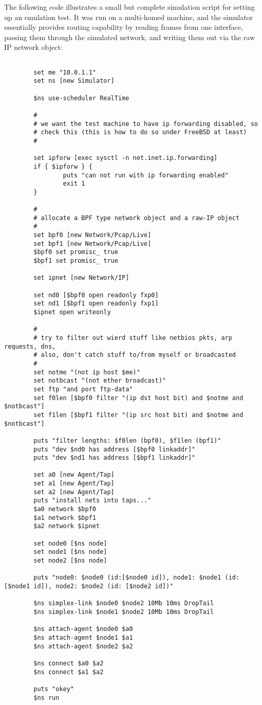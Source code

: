 The following code illustrates a small but complete
simulation script for setting up an emulation test.
It was run on a multi-homed machine, and the simulator essentially
provides routing capability by reading frames from one interface,
passing them through the simulated network, and writing them
out via the raw IP network object:
\begin{verbatim}

        set me "10.0.1.1"
        set ns [new Simulator]

        $ns use-scheduler RealTime

        #
        # we want the test machine to have ip forwarding disabled, so
        # check this (this is how to do so under FreeBSD at least)
        #

        set ipforw [exec sysctl -n net.inet.ip.forwarding]
        if { $ipforw } {
                puts "can not run with ip forwarding enabled"
                exit 1
        }

        #
        # allocate a BPF type network object and a raw-IP object
        #
        set bpf0 [new Network/Pcap/Live]
        set bpf1 [new Network/Pcap/Live]
        $bpf0 set promisc_ true
        $bpf1 set promisc_ true

        set ipnet [new Network/IP]

        set nd0 [$bpf0 open readonly fxp0]
        set nd1 [$bpf1 open readonly fxp1]
        $ipnet open writeonly

        #
        # try to filter out wierd stuff like netbios pkts, arp requests, dns,
        # also, don't catch stuff to/from myself or broadcasted
        #
        set notme "(not ip host $me)"
        set notbcast "(not ether broadcast)"
        set ftp "and port ftp-data"
        set f0len [$bpf0 filter "(ip dst host bit) and $notme and $notbcast"]
        set f1len [$bpf1 filter "(ip src host bit) and $notme and $notbcast"]

        puts "filter lengths: $f0len (bpf0), $f1len (bpf1)"
        puts "dev $nd0 has address [$bpf0 linkaddr]"
        puts "dev $nd1 has address [$bpf1 linkaddr]"

        set a0 [new Agent/Tap]
        set a1 [new Agent/Tap]
        set a2 [new Agent/Tap]
        puts "install nets into taps..."
        $a0 network $bpf0
        $a1 network $bpf1
        $a2 network $ipnet

        set node0 [$ns node]
        set node1 [$ns node]
        set node2 [$ns node]

        puts "node0: $node0 (id:[$node0 id]), node1: $node1 (id:[$node1 id]), node2: $node2 (id: [$node2 id])"

        $ns simplex-link $node0 $node2 10Mb 10ms DropTail
        $ns simplex-link $node1 $node2 10Mb 10ms DropTail

        $ns attach-agent $node0 $a0
        $ns attach-agent $node1 $a1
        $ns attach-agent $node2 $a2

        $ns connect $a0 $a2
        $ns connect $a1 $a2

        puts "okey"
        $ns run
\end{verbatim}

\endinput
